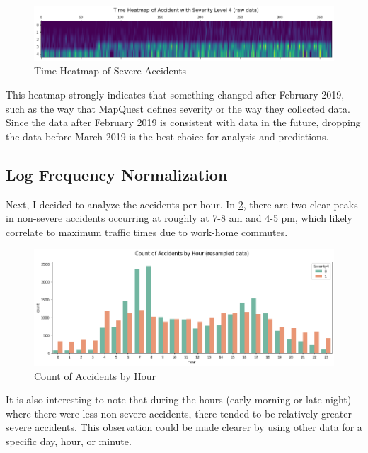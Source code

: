 \begin{figure}[H]
    \centering
    \includegraphics[width=130mm,height=\textheight,keepaspectratio]{images/severe_heatmap.png}
    \caption{Time Heatmap of Severe Accidents}
    \label{fig:severe_heatmap}
\end{figure}

This heatmap strongly indicates that something changed after February 2019, such as the way that MapQuest defines severity or the way they collected data. Since the data after February 2019 is consistent with data in the future, dropping the data before March 2019 is the best choice for analysis and predictions.

\subsection{Log Frequency Normalization}
Next, I decided to analyze the accidents per hour. In \cref{fig:counts_hour}, there are two clear peaks in non-severe accidents occurring at roughly at 7-8 am and 4-5 pm, which likely correlate to maximum traffic times due to work-home commutes.

\begin{figure}[H]
    \centering
    \includegraphics[width=130mm,height=\textheight,keepaspectratio]{images/count_hour.png}
    \caption{Count of Accidents by Hour}
    \label{fig:counts_hour}
\end{figure}

It is also interesting to note that during the hours (early morning or late night) where there were less non-severe accidents, there tended to be relatively greater severe accidents. This observation could be made clearer by using other data for a specific day, hour, or minute. 


